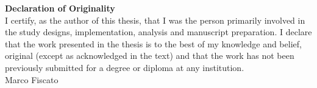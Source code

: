 {\LARGE {\bf Declaration of Originality}}\\

I certify, as the author of this thesis, that I was the person primarily involved in the study designs,
implementation, analysis and manuscript preparation. I declare that the work presented in the thesis is to the best of my knowledge and belief, original (except
as acknowledged in the text) and that the work has not been previously submitted for a degree or
diploma at any institution.\\

Marco Fiscato
